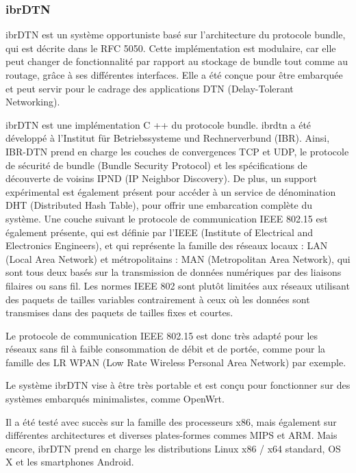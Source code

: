 \documentclass[a4paper,10pt]{article}
\begin{document}
\subsubsection{ibrDTN}
ibrDTN est un système opportuniste basé sur l'architecture du protocole bundle, qui est décrite dans le RFC 5050. Cette implémentation est modulaire, car elle peut changer de fonctionnalité par rapport au stockage de bundle tout comme au routage, grâce à ses différentes interfaces. Elle a été conçue pour être embarquée et peut servir pour le cadrage des applications DTN (Delay-Tolerant Networking). \par

ibrDTN est une implémentation C ++ du protocole bundle. ibrdtn a été développé à l’Institut für Betriebssysteme und Rechnerverbund (IBR). Ainsi, IBR-DTN prend en charge les couches de convergences TCP et UDP, le protocole de sécurité de bundle (Bundle Security Protocol) et les spécifications de découverte de voisins IPND (IP Neighbor Discovery). De plus, un support expérimental est également présent pour accéder à un service de dénomination DHT (Distributed Hash Table), pour offrir une embarcation complète du système. Une couche suivant le protocole de communication IEEE 802.15 est également présente, qui est définie par l’IEEE (Institute of Electrical and Electronics Engineers), et qui représente la famille des réseaux locaux : LAN (Local Area Network) et métropolitains : MAN (Metropolitan Area Network), qui sont tous deux basés sur la transmission de données numériques par des liaisons filaires ou sans fil. Les normes IEEE 802 sont plutôt limitées aux réseaux utilisant des paquets de tailles variables contrairement à ceux où les données sont transmises dans des paquets de tailles fixes et courtes. \cite{ibrdtn} \par

Le protocole de communication IEEE 802.15 est donc très adapté pour les réseaux sans fil à faible consommation de débit et de portée, comme pour la famille des LR WPAN (Low Rate Wireless Personal Area Network) par exemple. \par

Le système ibrDTN vise à être très portable et est conçu pour fonctionner sur des systèmes embarqués minimalistes, comme OpenWrt.\par

Il a été testé avec succès sur la famille des processeurs x86,  mais également sur différentes architectures et diverses plates-formes commes MIPS et ARM. Mais encore, ibrDTN prend en charge les distributions Linux x86 / x64 standard, OS X et les smartphones Android. \par
\end{document}
